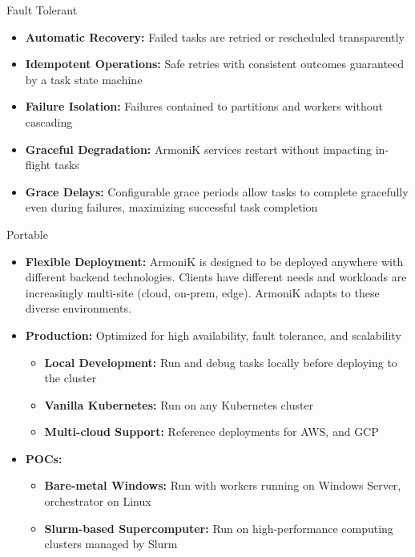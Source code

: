 \begin{frame}{Fault Tolerant}
	\begin{itemize}
		\item \textbf{Automatic Recovery:} Failed tasks are retried or rescheduled transparently
		\item \textbf{Idempotent Operations:} Safe retries with consistent outcomes guaranteed by a task state machine
		\item \textbf{Failure Isolation:} Failures contained to partitions and workers without cascading
		\item \textbf{Graceful Degradation:} ArmoniK services restart without impacting in-flight tasks
		\item \textbf{Grace Delays:} Configurable grace periods allow tasks to complete gracefully even during failures, maximizing successful task completion
	\end{itemize}
\end{frame}

\begin{frame}{Portable}
	\begin{itemize}
		\item \textbf{Flexible Deployment:} ArmoniK is designed to be deployed anywhere with different backend technologies. Clients have different needs and workloads are increasingly multi-site (cloud, on-prem, edge). ArmoniK adapts to these diverse environments.
		\item \textbf{Production:} Optimized for high availability, fault tolerance, and scalability
		      \begin{itemize}
			      \item \textbf{Local Development:} Run and debug tasks locally before deploying to the cluster
			      \item \textbf{Vanilla Kubernetes:} Run on any Kubernetes cluster
			      \item \textbf{Multi-cloud Support:} Reference deployments for AWS, and GCP
		      \end{itemize}
		\item \textbf{POCs:}
		      \begin{itemize}
			      \item \textbf{Bare-metal Windows:} Run with workers running on Windows Server, orchestrator on Linux
			      \item \textbf{Slurm-based Supercomputer:} Run on high-performance computing clusters managed by Slurm
		      \end{itemize}
	\end{itemize}
\end{frame}

